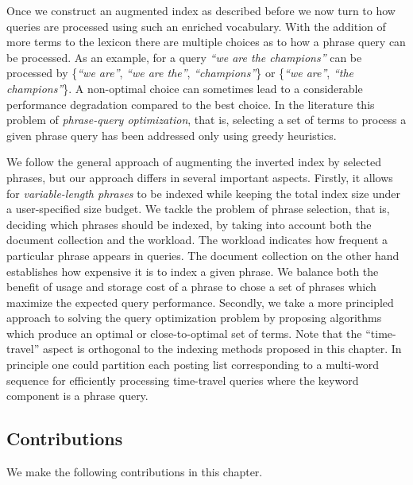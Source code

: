 Once we construct an augmented index as described before we now turn to how queries are processed using such an enriched vocabulary. With the addition of more terms to the lexicon there are multiple choices as to how a phrase query can be processed. As an example, for a query \emph{``we are the champions''} can be processed by \{\emph{``we are''}, \emph{``we are the''}, \emph{``champions''}\} or \{\emph{``we are''}, \emph{``the champions''}\}. A non-optimal choice can sometimes lead to a considerable performance degradation compared to the best choice. In the literature this problem of \emph{phrase-query optimization}, that is, selecting a set of terms to process a given phrase query has been addressed only using greedy heuristics. 

We follow the general approach of augmenting the inverted index
by selected phrases, but our approach differs in several
important aspects. Firstly, it allows for \emph{variable-length phrases} to be indexed while keeping the total index size under a user-specified size budget. We tackle the problem of phrase selection, that is, deciding which phrases should be indexed, by taking into account both the document collection and the workload. The workload indicates how frequent a particular phrase appears in queries. The document collection on the other hand establishes how expensive it is to index a given phrase. We balance both the benefit of usage and storage cost of a phrase to chose a set of phrases which maximize the expected query performance. Secondly, we take a more principled approach to solving the query optimization problem by proposing algorithms which produce an optimal or close-to-optimal set of terms. Note that the ``time-travel'' aspect is orthogonal to the indexing methods proposed in this chapter. In principle one could partition each posting list corresponding to a multi-word sequence for efficiently processing time-travel queries where the keyword component is a phrase query.


\subsection{Contributions} 
We make the following contributions in this chapter.

